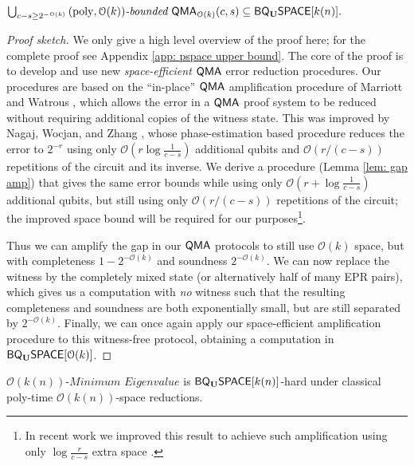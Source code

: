 \documentclass[a4paper,UKenglish]{lipics-v2016}
\newcommand\QMA{{\sf{QMA}}}
\newcommand\bddQMA[5]{{\left(#1,#2\right)}\textit{-bounded }\QMA_{#3}(#4,#5)}
\newcommand\spechamiltonian[1]{\ensuremath{#1}\textit{-Minimum Eigenvalue}}
\newcommand{\classfont}{\sf}
\newcommand{\Unitary}{\mathbf{U}}
\newcommand{\unitaryBQSPACE}[1]{{\classfont{BQ}_\Unitary\classfont{SPACE}}[#1]}
\newcommand\bigoh{\mathcal{O}}
\DeclareMathOperator{\poly}{poly}
\begin{document}
\begin{lemma} \label{lem: pspace upper bound}
$\bigcup_{c - s \ge 2^{-\bigoh(k)}}\bddQMA{\poly}{\bigoh(k)}{\bigoh(k)}{c}{s} \subseteq \unitaryBQSPACE{k(n)}.$
\end{lemma}
\begin{proof}[Proof sketch]
We only give a high level overview of the proof here; for the complete proof see Appendix \ref{app: pspace upper bound}. The core of the proof is to develop and use new {\emph{space-efficient}} $\QMA$ error reduction procedures. Our procedures are based on the ``in-place'' $\QMA$ amplification procedure of Marriott and Watrous \cite{mw05}, which allows the error in a $\QMA$ proof system to be reduced without requiring additional copies of the witness state. This was improved by Nagaj, Wocjan, and Zhang \cite{nwz11}, whose phase-estimation based procedure reduces the error to $2^{-r}$ using only $\bigoh\left(r\log{\frac{1}{c-s}}\right)$ additional qubits and $\bigoh(r/(c-s))$ repetitions of the circuit and its inverse. We derive a procedure (Lemma \ref{lem: gap amp}) that gives the same error bounds while using only $\bigoh\left(r+\log{\frac{1}{c-s}}\right)$ additional qubits, but still using only $\bigoh(r/(c-s))$ repetitions of the circuit; the improved space bound will be required for our purposes\footnote{In recent work we improved this result to achieve such amplification using only $\log{\frac{r}{c-s}}$ extra space \cite{fklmn16}.}.

Thus we can amplify the gap in our $\QMA$ protocols to still use $\bigoh(k)$ space, but with completeness $1-2^{-\bigoh(k)}$ and soundness $2^{-\bigoh(k)}$. We can now replace the witness by the completely mixed state (or alternatively half of many EPR pairs), which gives us a computation with \emph{no} witness such that the resulting completeness and soundness are both exponentially small, but are still separated by $2^{-\bigoh(k)}$. Finally, we can once again apply our space-efficient amplification procedure to this witness-free protocol, obtaining a computation in $\unitaryBQSPACE{\bigoh(k)}$.
\end{proof}

\begin{lemma}\label{lem: specham-hardness}
$\spechamiltonian{\bigoh(k(n))}$ is $\unitaryBQSPACE{k(n)}$-hard under classical poly-time $\bigoh(k(n))$-space reductions.
\end{lemma}
\end{document}
